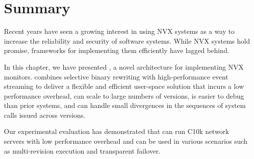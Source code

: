 \section{Summary}
\label{efficient-execution:summary}

Recent years have seen a growing interest in using NVX systems as a way to
increase the reliability and security of software systems.  While NVX systems
hold promise, frameworks for implementing them efficiently have lagged behind.

In this chapter, we have presented \varan, a novel architecture for
implementing NVX monitors. \varan combines selective binary rewriting with
high-performance event streaming to deliver a flexible and efficient user-space
solution that incurs a low performance overhead, can scale to large numbers of
versions, is easier to debug than prior systems, and can handle small
divergences in the sequences of system calls issued across versions.

Our experimental evaluation has demonstrated that \varan can run C10k network
servers with low performance overhead and can be used in various scenarios such
as multi-revision execution and transparent failover.
